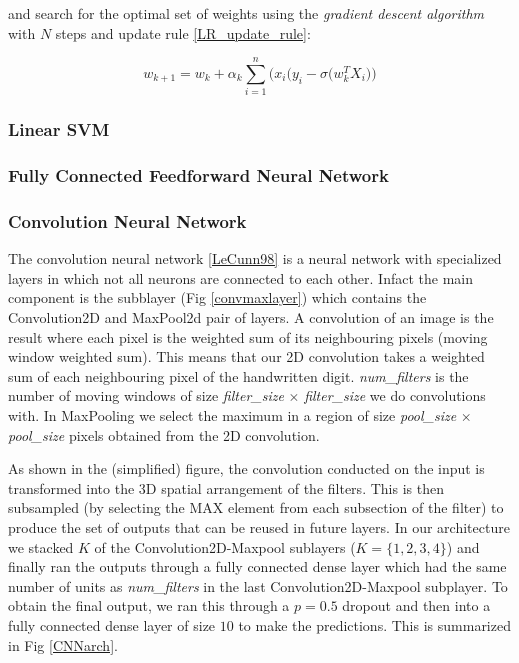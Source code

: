 \documentclass[conference]{IEEEtran}
\begin{document}
and search for the optimal set of weights using the \emph{gradient descent algorithm} with $N$ steps and update rule \ref{LR_update_rule}:

\begin{equation}
\label{LR_update_rule}
	w_{k+1} = w_k + \alpha_k \sum_{i=1}^n \Big( x_i\big(y_i - \sigma(w_k^TX_i\big) \Big)
\end{equation}


\subsubsection{Linear SVM}

\subsubsection{Fully Connected Feedforward Neural Network}

\subsubsection{Convolution Neural Network}
The convolution neural network \ref{LeCunn98} is a neural network with specialized layers in which not all neurons are connected to each other. Infact the main component is the subblayer (Fig \ref{convmaxlayer}) which contains the Convolution2D and MaxPool2d pair of layers. A convolution of an image is the result where each pixel is the weighted sum of its neighbouring pixels (moving window weighted sum). This means that our 2D convolution takes a weighted sum of each neighbouring pixel of the handwritten digit. \emph{num\_filters} is the number of moving windows of size \emph{filter\_size} $\times$ \emph{filter\_size} we do convolutions with. In MaxPooling we select the maximum in a region of size \emph{pool\_size} $\times$ \emph{pool\_size} pixels obtained from the 2D convolution.

As shown in the (simplified) figure, the convolution conducted on the input is transformed into the 3D spatial arrangement of the filters. This is then subsampled (by selecting the MAX element from each subsection of the filter) to produce the set of outputs that can be reused in future layers. In our architecture we stacked $K$ of the Convolution2D-Maxpool sublayers ($K=\{1,2,3,4\}$) and finally ran the outputs through a fully connected dense layer which had the same number of units as \emph{num\_filters} in the last Convolution2D-Maxpool subplayer. To obtain the final output, we ran this through a $p=0.5$ dropout and then into a fully connected dense layer of size $10$ to make the predictions. This is summarized in Fig \ref{CNNarch}. 
\end{document}
